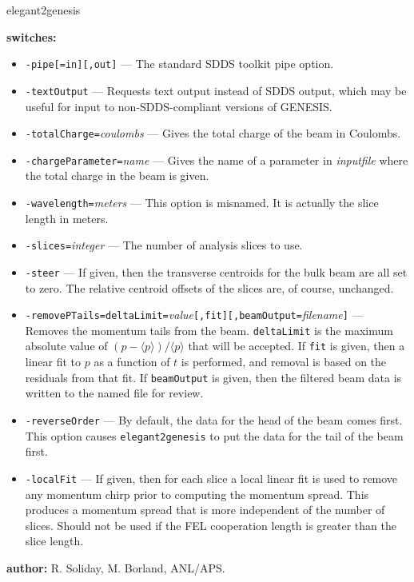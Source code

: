 \begin{sddsprog}{elegant2genesis}
  \item \textbf{switches:}
  \begin{itemize}
    \item \verb|-pipe[=in][,out]| --- The standard SDDS toolkit pipe option.
    \item \verb|-textOutput| --- Requests text output instead of SDDS output, which may be useful for input to non-SDDS-compliant versions of GENESIS.
    \item \verb|-totalCharge=|{\em coulombs} --- Gives the total charge of the beam in Coulombs.
    \item \verb|-chargeParameter=|{\em name} --- Gives the name of a parameter in {\em inputfile} where the total charge in the beam is given.
    \item \verb|-wavelength=|{\em meters} --- This option is misnamed.  It is actually the slice length in meters.
    \item \verb|-slices=|{\em integer} --- The number of analysis slices to use.
    \item \verb|-steer| --- If given, then the transverse centroids for the bulk beam are all set to zero.  The relative centroid offsets of the slices are, of course, unchanged.
    \item \verb|-removePTails=deltaLimit=|{\em value}\verb|[,fit][,beamOutput=|{\em filename}\verb|]| --- Removes the momentum tails from the beam.  \verb|deltaLimit| is the maximum absolute value of $(p-\langle p \rangle)/\langle p \rangle$ that will be accepted.  If \verb|fit| is given, then a linear fit to $p$ as a function of $t$ is performed, and removal is based on the residuals from that fit.  If \verb|beamOutput| is given, then the filtered beam data is written to the named file for review.
    \item \verb|-reverseOrder| --- By default, the data for the head of the beam comes first.  This option causes \verb|elegant2genesis| to put the data for the tail of the beam first.
    \item \verb|-localFit| --- If given, then for each slice a local linear fit is used to remove any momentum chirp prior to computing the momentum spread.  This produces a momentum spread that is more independent of the number of slices.  Should not be used if the FEL cooperation length is greater than the slice length.
  \end{itemize}

  \item \textbf{author:} R. Soliday, M. Borland, ANL/APS.
\end{sddsprog}

